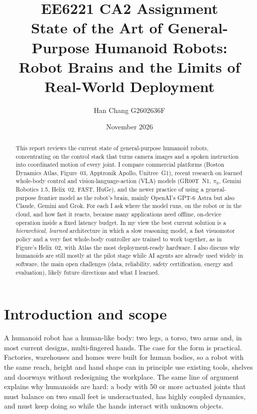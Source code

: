 \documentclass[11pt,a4paper]{article}
\title{\textbf{EE6221 CA2 Assignment}\\[4pt]
\large State of the Art of General-Purpose Humanoid Robots:\\
Robot Brains and the Limits of Real-World Deployment}
\author{Han Chang \quad G2602636F}
\date{November 2026}
\begin{document}
\maketitle

\begin{abstract}
\noindent
This report reviews the current state of general-purpose humanoid robots,
concentrating on the control stack that turns camera images and a spoken
instruction into coordinated motion of every joint.  I compare commercial
platforms (Boston Dynamics Atlas, Figure~03, Apptronik Apollo, Unitree~G1),
recent research on learned whole-body control and vision-language-action (VLA)
models (GR00T~N1, $\pi_0$, Gemini Robotics 1.5, Helix~02, FAST, HuGe), and the
newer practice of using a general-purpose frontier model as the robot's brain,
mainly OpenAI's GPT-6 Astra but also Claude, Gemini and Grok.  For each I ask
where the model runs, on the robot or in the cloud, and how fast it reacts,
because many applications need offline, on-device operation inside a fixed
latency budget.  In my view the best current solution is a \emph{hierarchical,
learned} architecture in which a slow reasoning model, a fast visuomotor policy
and a very fast whole-body controller are trained to work together, as in
Figure's Helix~02, with Atlas the most deployment-ready hardware.  I also
discuss why humanoids are still mostly at the pilot stage while AI agents are
already used widely in software, the main open challenges (data, reliability,
safety certification, energy and evaluation), likely future directions and what
I learned.
\end{abstract}

\setcounter{tocdepth}{1}
\tableofcontents
\newpage

\section{Introduction and scope}

A humanoid robot has a human-like body: two legs, a torso, two arms and, in
most current designs, multi-fingered hands.  The case for the form is
practical.  Factories, warehouses and homes were built for human bodies, so a
robot with the same reach, height and hand shape can in principle use existing
tools, shelves and doorways without redesigning the workplace.  The same line
of argument explains why humanoids are hard: a body with 50 or more actuated
joints that must balance on two small feet is underactuated, has highly coupled
dynamics, and must keep doing so while the hands interact with unknown objects.
\end{document}
